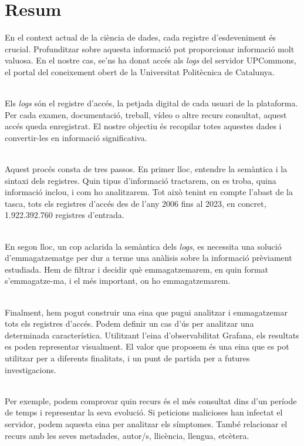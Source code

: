 \chapter*{Resum}\label{ch:abstract-ca}

En el context actual de la ciència de dades, cada registre d'esdeveniment és crucial.
Profunditzar sobre aquesta informació pot proporcionar informació molt valuosa.
En el nostre cas, se'ns ha donat accés als \textit{\gls{log}s} del servidor UPCommons, el portal del coneixement obert de la Universitat Politècnica de Catalunya.

\noindent \\
Els \textit{\gls{log}s} són el registre d'accés, la petjada digital de cada usuari de la plataforma.
Per cada examen, documentació, treball, vídeo o altre recurs consultat, aquest accés queda enregistrat.
El nostre objectiu és recopilar totes aquestes dades i convertir-les en informació significativa.

\noindent \\
Aquest procés consta de tres passos.
En primer lloc, entendre la semàntica i la sintaxi dels registres.
Quin tipus d'informació tractarem, on es troba, quina informació inclou, i com ho analitzarem.
Tot això tenint en compte l'abast de la tasca, tots els registres d'accés des de l'any 2006 fins al 2023, en concret, 1.922.392.760 registres d'entrada.

\noindent \\
En segon lloc, un cop aclarida la semàntica dels \textit{\gls{log}s}, es necessita una solució d'emmagatzematge per dur a terme una anàlisis sobre la informació prèviament estudiada.
Hem de filtrar i decidir què emmagatzemarem, en quin format s'emmagatze-ma, i el més important, on ho emmagatzemarem.

\noindent \\
Finalment, hem pogut construir una eina que pugui analitzar i emmagatzemar tots els registres d'accés.
Podem definir un cas d'ús per analitzar una determinada característica.
Utilitzant l'eina d'observabilitat Grafana, els resultats es poden representar visualment.
El valor que proposem és una eina que es pot utilitzar per a diferents finalitats, i un punt de partida per a futures investigacions.

\noindent \\
Per exemple, podem comprovar quin recurs és el més consultat dins d'un període de temps i representar la seva evolució.
Si peticions malicioses han infectat el servidor, podem aquesta eina per analitzar els símptomes.
També relacionar el recurs amb les seves metadades, autor/s, llicència, llengua, etcètera.

